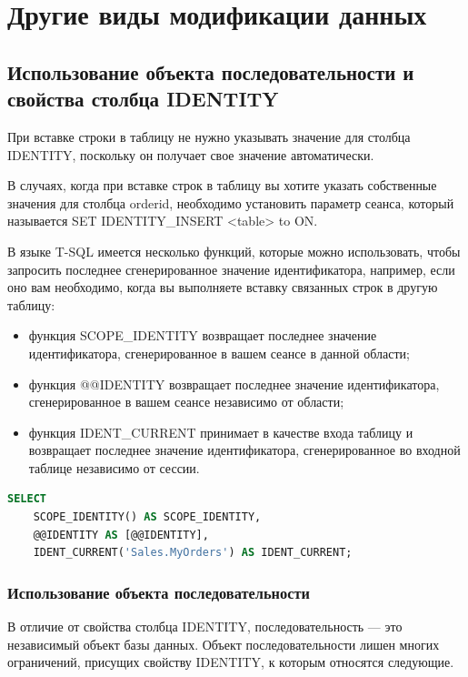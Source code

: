 \chapter{Другие виды модификации данных}
\section{Использование
объекта последовательности
и свойства столбца IDENTITY}



При вставке строки в таблицу не нужно указывать значение для столбца IDENTITY,
поскольку он получает свое значение автоматически.

В случаях, когда при вставке строк в таблицу вы хотите указать собственные значения для столбца orderid, необходимо установить параметр сеанса, который называется SET IDENTITY\_INSERT <table> to ON.

В языке T-SQL имеется несколько функций, которые можно использовать, чтобы
запросить последнее сгенерированное значение идентификатора, например, если
оно вам необходимо, когда вы выполняете вставку связанных строк в другую таблицу:

\begin{itemize}
	\item функция SCOPE\_IDENTITY возвращает последнее значение идентификатора, сгенерированное в вашем сеансе в данной области; 
	\item функция @@IDENTITY возвращает последнее значение идентификатора, сгенерированное в вашем сеансе независимо от области; 
	\item функция IDENT\_CURRENT принимает в качестве входа таблицу и возвращает последнее значение идентификатора, сгенерированное во входной таблице независимо от сессии. 
\end{itemize}

\begin{lstlisting}[label=lst:funcReturn, language=sql]
	SELECT
	SCOPE_IDENTITY() AS SCOPE_IDENTITY,
	@@IDENTITY AS [@@IDENTITY],
	IDENT_CURRENT('Sales.MyOrders') AS IDENT_CURRENT; 
\end{lstlisting}

\subsection{Использование объекта последовательности}

В отличие от свойства
столбца IDENTITY, последовательность — это независимый объект базы данных.
Объект последовательности лишен многих ограничений, присущих свойству
IDENTITY, к которым относятся следующие. 

